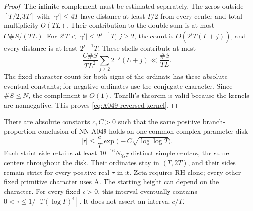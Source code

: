 \begin{proof}
The infinite complement must be estimated separately.
The zeros outside \([T/2,3T]\) with \(|\gamma'|\le4T\)
have distance at least \(T/2\) from every center and total
multiplicity \(O(TL)\). Their contribution to the double
sum is at most \(C\#S/(TL)\).
For \(2^jT<|\gamma'|\le2^{j+1}T\), \(j\ge2\), the
count is \(O(2^jT(L+j))\), and every distance is at least
\(2^{j-1}T\). These shells contribute at most
\[
 \frac{C\#S}{TL^2}\sum_{j\ge2}2^{-j}(L+j)
                         \ll\frac{\#S}{TL}.
\]
The fixed-character count for both signs of the ordinate
has these absolute eventual constants; for negative
ordinates use the conjugate character. Since \(\#S\le N\),
the complement is \(O(1)\). Tonelli's theorem is valid
because the kernels are nonnegative. This proves
\eqref{eq:A049-reversed-kernel}.
\end{proof}

\begin{corollary}
\label{cor:A049-sublogarithmic}
There are absolute constants \(c,C>0\) such that the same
positive branch-proportion conclusion of NN-A049 holds on
one common complex parameter disk
\begin{equation}\label{eq:A049-sublog-time}
               |\tau|\le\frac cT
                         \exp\bigl(-C\sqrt{\log\log T}\bigr).
\end{equation}
Each strict side retains at least \(10^{-16}N_{\chi,T}\)
distinct simple centers, the same centers throughout the
disk. Their ordinates stay in \((T,2T)\), and their sides
remain strict for every positive real \(\tau\) in it.
Zeta requires RH alone; every other fixed primitive character
uses A. The starting height can depend on the character.
For every fixed \(\epsilon>0\), this interval eventually
contains \(0<\tau\le1/[T(\log T)^\epsilon]\).
It does not assert an interval \(c/T\).
\end{corollary}

